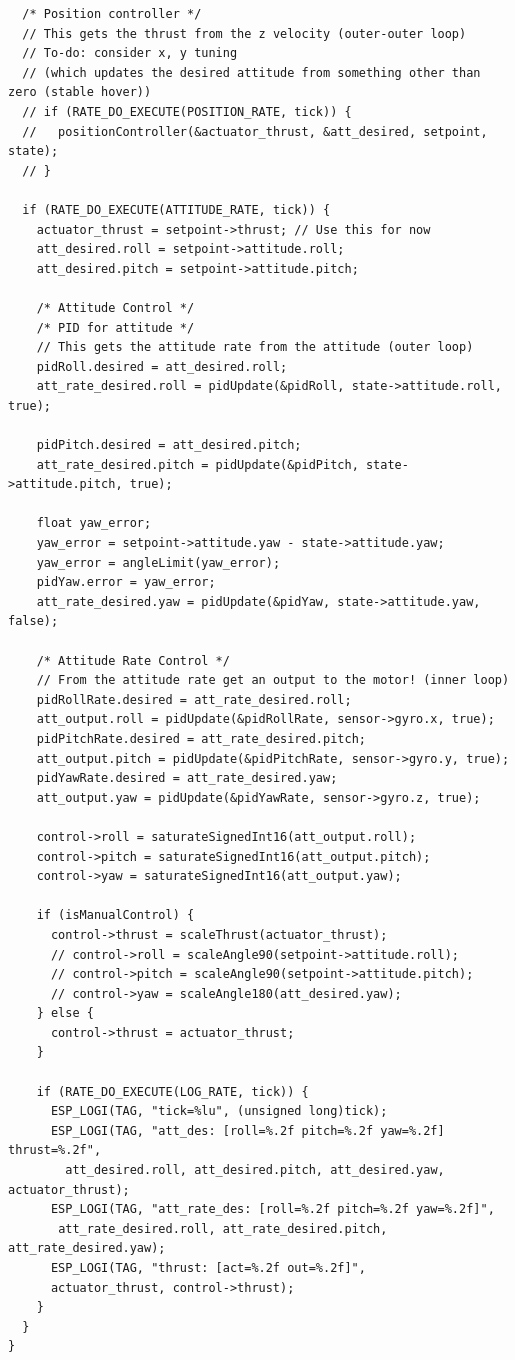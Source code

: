 \begin{lstlisting}
  /* Position controller */
  // This gets the thrust from the z velocity (outer-outer loop)
  // To-do: consider x, y tuning
  // (which updates the desired attitude from something other than zero (stable hover))
  // if (RATE_DO_EXECUTE(POSITION_RATE, tick)) {
  //   positionController(&actuator_thrust, &att_desired, setpoint, state);
  // }

  if (RATE_DO_EXECUTE(ATTITUDE_RATE, tick)) {
    actuator_thrust = setpoint->thrust; // Use this for now 
    att_desired.roll = setpoint->attitude.roll;
    att_desired.pitch = setpoint->attitude.pitch; 

    /* Attitude Control */
    /* PID for attitude */
    // This gets the attitude rate from the attitude (outer loop)
    pidRoll.desired = att_desired.roll;
    att_rate_desired.roll = pidUpdate(&pidRoll, state->attitude.roll, true); 

    pidPitch.desired = att_desired.pitch;
    att_rate_desired.pitch = pidUpdate(&pidPitch, state->attitude.pitch, true); 

    float yaw_error;
    yaw_error = setpoint->attitude.yaw - state->attitude.yaw;
    yaw_error = angleLimit(yaw_error);
    pidYaw.error = yaw_error;
    att_rate_desired.yaw = pidUpdate(&pidYaw, state->attitude.yaw, false);
    
    /* Attitude Rate Control */
    // From the attitude rate get an output to the motor! (inner loop)
    pidRollRate.desired = att_rate_desired.roll;
    att_output.roll = pidUpdate(&pidRollRate, sensor->gyro.x, true);
    pidPitchRate.desired = att_rate_desired.pitch;
    att_output.pitch = pidUpdate(&pidPitchRate, sensor->gyro.y, true);
    pidYawRate.desired = att_rate_desired.yaw;
    att_output.yaw = pidUpdate(&pidYawRate, sensor->gyro.z, true);

    control->roll = saturateSignedInt16(att_output.roll);
    control->pitch = saturateSignedInt16(att_output.pitch);
    control->yaw = saturateSignedInt16(att_output.yaw);

    if (isManualControl) {
      control->thrust = scaleThrust(actuator_thrust);
      // control->roll = scaleAngle90(setpoint->attitude.roll);
      // control->pitch = scaleAngle90(setpoint->attitude.pitch); 
      // control->yaw = scaleAngle180(att_desired.yaw); 
    } else {
      control->thrust = actuator_thrust;
    } 

    if (RATE_DO_EXECUTE(LOG_RATE, tick)) {
      ESP_LOGI(TAG, "tick=%lu", (unsigned long)tick);
      ESP_LOGI(TAG, "att_des: [roll=%.2f pitch=%.2f yaw=%.2f] thrust=%.2f",
        att_desired.roll, att_desired.pitch, att_desired.yaw, actuator_thrust);
      ESP_LOGI(TAG, "att_rate_des: [roll=%.2f pitch=%.2f yaw=%.2f]",
       att_rate_desired.roll, att_rate_desired.pitch, att_rate_desired.yaw);
      ESP_LOGI(TAG, "thrust: [act=%.2f out=%.2f]",
      actuator_thrust, control->thrust);
    }
  }
}


\end{lstlisting}
